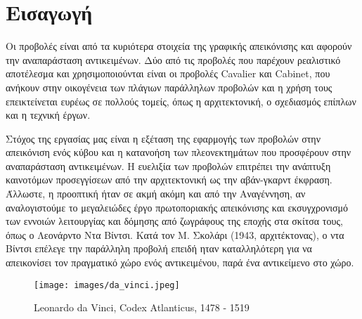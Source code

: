\chapter*{Εισαγωγή}

Οι προβολές είναι από τα κυριότερα στοιχεία της γραφικής απεικόνισης και αφορούν την αναπαράσταση αντικειμένων. Δύο από τις προβολές που παρέχουν ρεαλιστικό αποτέλεσμα  και χρησιμοποιούνται είναι οι προβολές \textlatin{Cavalier} και \textlatin{Cabinet}, που ανήκουν στην οικογένεια των πλάγιων παράλληλων προβολών και η χρήση τους επεικτείνεται ευρέως σε πολλούς τομείς, όπως η αρχιτεκτονική, ο σχεδιασμός επίπλων και η τεχνική έργων.

Στόχος της εργασίας μας είναι η εξέταση της εφαρμογής των προβολών στην απεικόνιση ενός κύβου και η κατανοήση των πλεονεκτημάτων που προσφέρουν στην αναπαράσταση αντικειμένων. Η ευελιξία των προβολών επιτρέπει την ανάπτυξη καινοτόμων προσεγγίσεων από την αρχιτεκτονική ως την αβάν-γκαρντ έκφραση. Άλλωστε, η προοπτική ήταν σε ακμή ακόμη και από την Αναγέννηση, αν αναλογιστούμε το μεγαλειώδες έργο πρωτοποριακής απεικόνισης και εκσυγχρονισμό των εννοιών λειτουργίας και δόμησης από ζωγράφους της εποχής στα σκίτσα τους, όπως ο Λεονάρντο Ντα Βίντσι. Κατά τον Μ. Σκολάρι (1943, αρχιτέκτονας), ο ντα Βίντσι επέλεγε την παράλληλη προβολή επειδή ηταν καταλληλότερη για να απεικονίσει τον πραγματικό χώρο ενός αντικειμένου, παρά ένα αντικείμενο στο χώρο. 

\vspace{1em}

\begin{figure}[H]
\centering
\texttt{[image: images/da\_vinci.jpeg]}
\caption{\textlatin{Leonardo da Vinci, Codex Atlanticus, 1478 - 1519}
}
\end{figure}
\pagebreak

